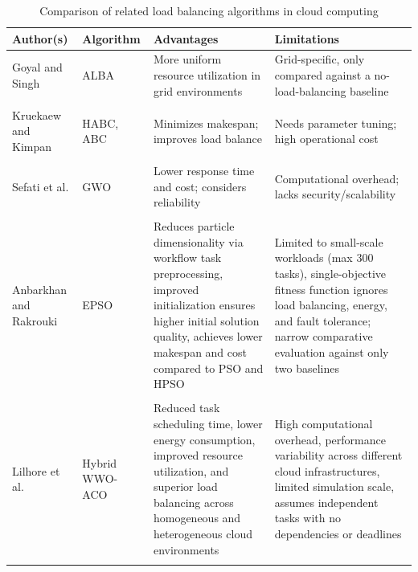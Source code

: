 \documentclass[pdflatex,sn-mathphys-num]{sn-jnl}%
\theoremstyle{thmstyleone}%
\theoremstyle{thmstyletwo}%
\theoremstyle{thmstylethree}%
\begin{document}
\begin{table}[h]
\caption{Comparison of related load balancing algorithms in cloud computing}\label{tab:relatedwork}
\begin{tabular*}{\textwidth}{@{\extracolsep\fill}p{2.5cm}p{2cm}p{3cm}p{3cm}}
\toprule
\textbf{Author(s)} & \textbf{Algorithm} & \textbf{Advantages} & \textbf{Limitations} 
\\
\midrule
Goyal and Singh \cite{bib10} & ALBA & More uniform resource utilization in grid environments & Grid-specific, only compared against a no-load-balancing baseline
\\
\\
Kruekaew and Kimpan \cite{bib12} & HABC, ABC & Minimizes makespan; improves load balance & Needs parameter tuning; high operational cost 
\\
\\
Sefati et al. \cite{bib9} & GWO & Lower response time and cost; considers reliability & Computational overhead; lacks security/scalability
\\
\\
Anbarkhan and Rakrouki \cite{Anbarkhan2023AnEP} & EPSO & Reduces particle dimensionality via workflow task preprocessing, improved initialization ensures higher initial solution quality, achieves lower makespan and cost compared to PSO and HPSO & Limited to small-scale workloads (max 300 tasks), single-objective fitness function ignores load balancing, energy, and fault tolerance; narrow comparative evaluation against only two baselines 
\\
\\
Lilhore et al. \cite{lilhore2025} & Hybrid WWO-ACO & 
Reduced task scheduling time, lower energy consumption, 
improved resource utilization, and superior load balancing 
across homogeneous and heterogeneous cloud environments & 
High computational overhead, performance variability across 
different cloud infrastructures, limited simulation scale, 
assumes independent tasks with no dependencies or deadlines
\\
\botrule
\end{tabular*}
\end{table}
\end{document}
